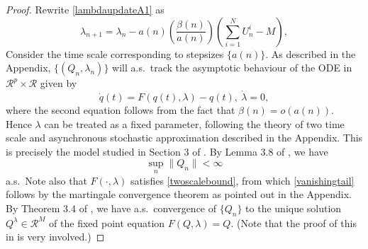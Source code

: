 \documentclass[12pt]{article}
\numberwithin{equation}{section}
\newcommand{\R}{\mathcal{R}}
\newcommand{\1}{\textbf{1}}
\begin{document}
\begin{proof}
Rewrite \eqref{lambdaupdateA1} as
\begin{equation}
\label{lambdaupdateA*}
\lambda_{n+1} = \lambda_n - a(n)\left(\frac{\beta(n)}{a(n)}\right) \left(\sum_{i=1}^{N} U^i_n-M\right),
\end{equation}
Consider the time scale corresponding to stepsizes $\{a(n)\}$. As described in the Appendix,  $\{(Q_n, \lambda_n)\}$ will a.s.\ track the asymptotic behaviour of the ODE in $\R^p\times\R$ given by
\begin{equation}
\dot{q}(t) = F(q(t), \lambda) - q(t),  \ \dot{\lambda} = 0,\label{FPode}
\end{equation}
where the second equation follows from the fact that $\beta(n) = o(a(n))$. Hence  $\lambda$ can be treated as a fixed parameter, following the theory of two time scale and asynchronous stochastic approximation described in the Appendix. This is precisely the model studied in Section 3 of \cite{Abounadi}. By Lemma 3.8 of \cite{Abounadi}, we have 
\begin{equation}
\sup_n\|Q_n\| < \infty \label{qunibound}
\end{equation} 
a.s.\ Note also that $F(\cdot, \lambda)$ satisfies \eqref{twoscalebound}, from which \eqref{vanishingtail} follows by the martingale convergence theorem as pointed out in the Appendix.
 By Theorem 3.4 of \cite{Abounadi}, we have a.s.\ convergence of $\{Q_n\}$ to the unique solution $Q^\lambda \in \R^M$ of the fixed point equation $F(Q, \lambda) = Q$. (Note that the proof of this in \cite{Abounadi} is very involved.)


\end{proof}
\end{document}
